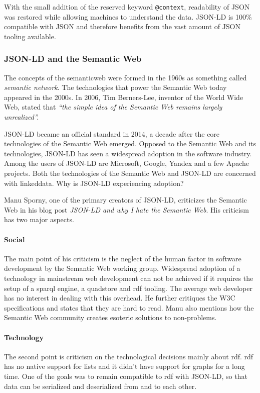 With the small addition of the reserved keyword \lstinline{@context}, readability of JSON was restored while allowing machines to understand the data. JSON-LD is 100\% compatible with JSON and therefore benefits from the vast amount of JSON tooling available.


\subsubsection{JSON-LD and the Semantic Web}
The concepts of the \gls{semanticweb} were formed in the 1960s as something called \textit{semantic network}. The technologies that power the Semantic Web today appeared in the 2000s. In 2006, Tim Berners-Lee, inventor of the World Wide Web, stated that \textit{``the simple idea of the Semantic Web remains largely unrealized''.} \citep{semanticwebrevisited}

JSON-LD became an official standard in 2014, a decade after the core technologies of the Semantic Web emerged. Opposed to the Semantic Web and its technologies, JSON-LD has seen a widespread adoption in the software industry. Among the users of JSON-LD are Microsoft, Google, Yandex and a few Apache projects. \citep{jsonldusers} Both the technologies of the Semantic Web and JSON-LD are concerned with \gls{linkeddata}. Why is JSON-LD experiencing adoption?

Manu Sporny, one of the primary creators of JSON-LD, criticizes the Semantic Web in his blog post \textit{JSON-LD and why I hate the Semantic Web}. His criticism has two major aspects.

\paragraph{Social}
The main point of his criticism is the neglect of the human factor in software development by the Semantic Web working group. Widespread adoption of a technology in mainstream web development can not be achieved if it requires the setup of a \gls{sparql} engine, a \gls{quadstore} and \gls{rdf} tooling. The average web developer has no interest in dealing with this overhead. He further critiques the W3C specifications and states that they are hard to read. \citep{semanticwebrevisited} Manu also mentions how the Semantic Web community creates esoteric solutions to non-problems. \citep{semanticwebrevisited}

\paragraph{Technology}
The second point is criticism on the technological decisions mainly about \gls{rdf}. \gls{rdf} has no native support for lists and it didn't have support for graphs for a long time. One of the goals was to remain compatible to \gls{rdf} with JSON-LD, so that data can be serialized and deserialized from and to each other. \citep{semanticwebrevisited}

